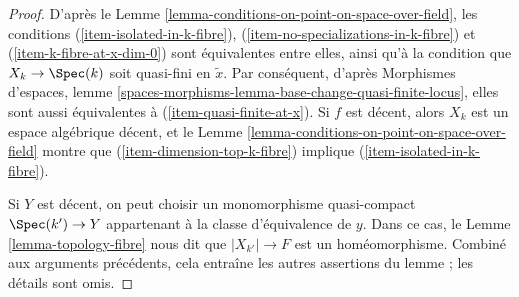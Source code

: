 \begin{proof}
D'après le Lemme \ref{lemma-conditions-on-point-on-space-over-field}, les
conditions (\ref{item-isolated-in-k-fibre}),
(\ref{item-no-specializations-in-k-fibre}) et
(\ref{item-k-fibre-at-x-dim-0}) sont équivalentes entre elles, ainsi qu'à la
condition que $X_k \to \Spec(k)$ soit quasi-fini en $\tilde x$.
Par conséquent, d'après Morphismes d'espaces, lemme
\ref{spaces-morphisms-lemma-base-change-quasi-finite-locus},
elles sont aussi équivalentes à (\ref{item-quasi-finite-at-x}).
Si $f$ est décent, alors $X_k$ est un espace algébrique décent, et le
Lemme \ref{lemma-conditions-on-point-on-space-over-field}
montre que (\ref{item-dimension-top-k-fibre}) implique
(\ref{item-isolated-in-k-fibre}).

\medskip\noindent
Si $Y$ est décent, on peut choisir un monomorphisme quasi-compact
$\Spec(k') \to Y$ appartenant à la classe d'équivalence de $y$. Dans ce cas,
le Lemme \ref{lemma-topology-fibre}
nous dit que $|X_{k'}| \to F$ est un homéomorphisme.
Combiné aux arguments précédents, cela entraîne les autres assertions du
lemme ; les détails sont omis.
\end{proof}

